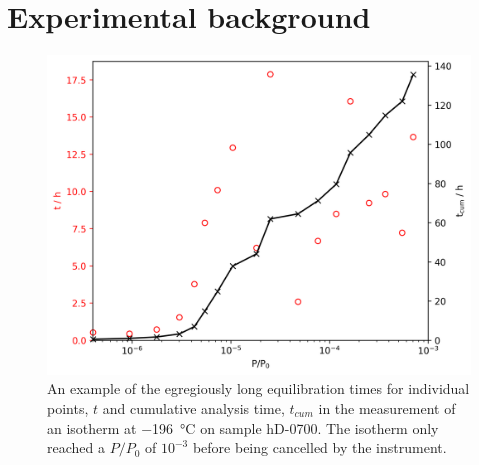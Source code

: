 \newpage
\section{Experimental background}
\label{s:dual_intro}

\begin{figure}[b!]
    \centering
    \includegraphics[width=0.95\columnwidth,keepaspectratio]{5-dual_isotherm/figs/timings.png}
    \caption{An example of the egregiously long equilibration times for individual points, $t$ and cumulative analysis time, $t_{cum}$ in the measurement of an  isotherm at \qty{-196}{\degreeCelsius} on sample hD-0700. The isotherm only reached a $P/P_0$ of $10^{-3}$ before being cancelled by the instrument.}
    \label{fig:timings}
\end{figure}

